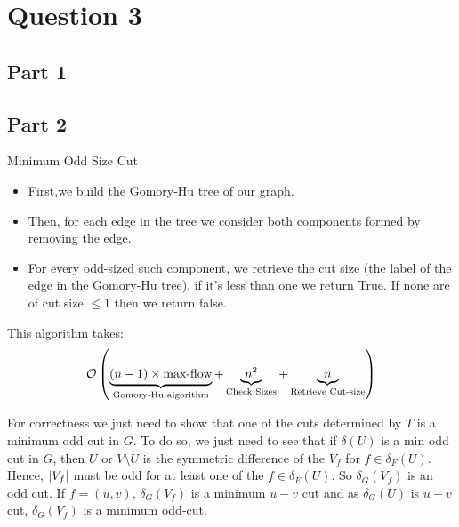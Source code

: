 \documentclass[math, info]{cours}
\begin{document}
\section{Question 3}
\subsection{Part 1}


\subsection{Part 2}
\begin{algorithm}
	\caption{Minimum Odd Size Cut}
	\begin{itemize}
		\item First,we build the Gomory-Hu tree of our graph.
		\item Then, for each edge in the tree we consider both components formed by removing the edge.
		\item For every odd-sized such component, we retrieve the cut size (the label of the edge in the Gomory-Hu tree), if it's less than one we return True.
			If none are of cut size $\leq 1$ then we return false.
	\end{itemize}
\end{algorithm}

This algorithm takes:
\begin{equation*}
	\mathcal{O}\left( \underbrace{(n-1)\times \text{max-flow}}_{\text{Gomory-Hu algorithm}} + \underbrace{n^{2}}_{\text{Check Sizes}} + \underbrace{n}_{\text{Retrieve Cut-size}} \right)
\end{equation*}

For correctness we just need to show that one of the cuts determined by $T$ is a minimum odd cut in $G$.
To do so, we just need to see that if $\delta(U)$ is a min odd cut in $G$, then $U$ or $V \setminus U$ is the symmetric difference of the $V_{f}$ for $f \in \delta_{F}(U)$.
Hence, $\left|V_{f}\right|$ must be odd for at least one of the $f\in \delta_{F}(U)$. So $\delta_{G}(V_{f})$ is an odd cut.
If $f = (u, v)$, $\delta_{G}(V_{f})$ is a minimum $u - v$ cut and as $\delta_{G}(U)$ is $u-v$ cut, $\delta_{G}(V_{f})$ is a minimum odd-cut.
\end{document}
